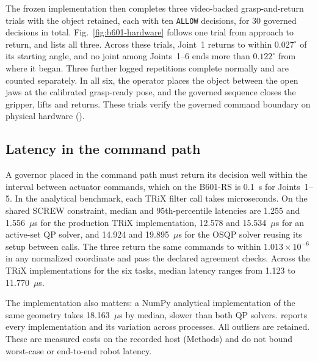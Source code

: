 \documentclass[12pt]{article}
\begin{document}
The frozen implementation then completes three video-backed
grasp-and-return trials with the object retained, each with ten \texttt{ALLOW}
decisions, for 30 governed decisions in total. Fig.~\ref{fig:b601-hardware}
follows one trial from approach to return, and  lists
all three. Across these trials, Joint~1
returns to within $0.027^\circ$ of its starting angle, and no joint among
Joints~1--6 ends more than $0.122^\circ$ from where it began. Three further
logged repetitions complete normally and are counted separately. In all six,
the operator places the object between the open jaws at the calibrated grasp-ready pose, and the governed sequence closes the gripper, lifts and returns. These trials
verify the governed command boundary on physical hardware
().

\subsection{Latency in the command path}
\label{sec:runtime-benchmark}
A governor placed in the command path must return its decision well within
the interval between actuator commands, which on the B601-RS is 0.1~s
for Joints~1--5. In the analytical benchmark, each TRiX filter call takes microseconds. On the shared SCREW constraint,
median and 95th-percentile latencies are 1.255 and 1.556~$\mu$s for the
production TRiX implementation, 12.578 and 15.534~$\mu$s for an active-set QP
solver, and 14.924 and 19.895~$\mu$s for the OSQP solver reusing its setup
between calls. The three return the same commands to within
$1.013\times10^{-6}$ in any normalized coordinate and pass the declared
agreement checks. Across the TRiX implementations for the six tasks, median
latency ranges from 1.123 to 11.770~$\mu$s.

The implementation also matters: a NumPy analytical implementation of the same geometry takes 18.163~$\mu$s by median, slower than
both QP solvers.  reports every implementation and
its variation across processes. All outliers are retained. These are measured
costs on the recorded host (Methods) and do not bound worst-case or end-to-end robot latency.
\end{document}
